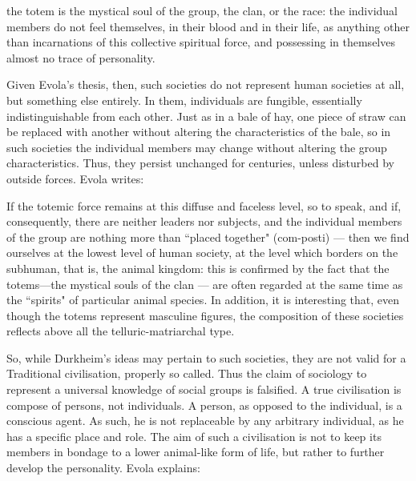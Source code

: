 \begin{quotex}
the totem is the mystical soul of the group, the clan, or the race: the individual members do not feel themselves, in their blood and in their life, as anything other than incarnations of this collective spiritual force, and possessing in themselves almost no trace of personality. 

\end{quotex}
Given Evola's thesis, then, such societies do not represent human societies at all, but something else entirely. In them, individuals are fungible, essentially indistinguishable from each other. Just as in a bale of hay, one piece of straw can be replaced with another without altering the characteristics of the bale, so in such societies the individual members may change without altering the group characteristics. Thus, they persist unchanged for centuries, unless disturbed by outside forces. Evola writes:

\begin{quotex}
If the totemic force remains at this diffuse and faceless level, so to speak, and if, consequently, there are neither leaders nor subjects, and the individual members of the group are nothing more than ``placed together" (com-posti) — then we find ourselves at the lowest level of human society, at the level which borders on the subhuman, that is, the animal kingdom: this is confirmed by the fact that the totems—the mystical souls of the clan — are often regarded at the same time as the ``spirits" of particular animal species. In addition, it is interesting that, even though the totems represent masculine figures, the composition of these societies reflects above all the telluric-matriarchal type. 

\end{quotex}
So, while Durkheim's ideas may pertain to such societies, they are not valid for a Traditional civilisation, properly so called. Thus the claim of sociology to represent a universal knowledge of social groups is falsified. A true civilisation is compose of persons, not individuals. A person, as opposed to the individual, is a conscious agent. As such, he is not replaceable by any arbitrary individual, as he has a specific place and role. The aim of such a civilisation is not to keep its members in bondage to a lower animal-like form of life, but rather to further develop the personality. Evola explains:

